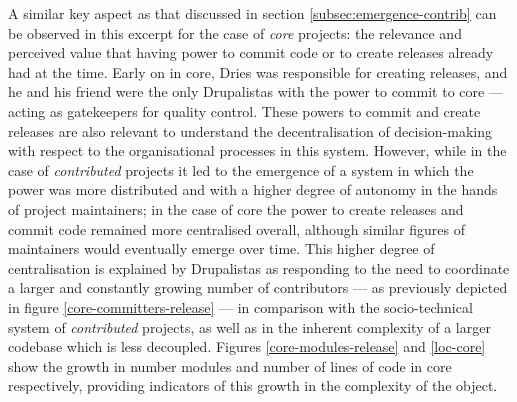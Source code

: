 A similar key aspect as that discussed in section \ref{subsec:emergence-contrib} can be observed in this excerpt for the case of \textit{core} projects: the relevance and perceived value that having power to commit code or to create releases already had at the time. Early on in core, Dries was responsible for creating releases, and he and his friend were the only Drupalistas with the power to commit to core --- acting as gatekeepers for quality control. These powers to commit and create releases are also relevant to understand the decentralisation of decision-making with respect to the organisational processes in this system. However, while in the case of \textit{contributed} projects it led to the emergence of a system in which the power was more distributed and with a higher degree of autonomy in the hands of project maintainers; in the case of core the power to create releases and commit code remained more centralised overall, although similar figures of maintainers would eventually emerge over time. This higher degree of centralisation is explained by Drupalistas as responding to the need to coordinate a larger and constantly growing number of contributors --- as previously depicted in figure \ref{core-committers-release} --- in comparison with the socio-technical system of \textit{contributed} projects, as well as in the inherent complexity of a larger codebase which is less decoupled. Figures \ref{core-modules-release} and \ref{loc-core} show the growth in number modules and number of lines of code in core respectively, providing indicators of this growth in the complexity of the object.

